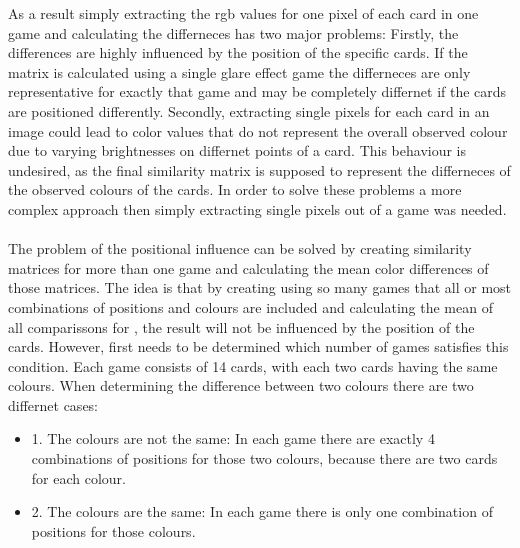 As a result simply extracting the rgb values for one pixel of each card in one game and calculating the differneces has two major problems: Firstly, the differences are highly influenced by the position of the specific cards. If the matrix is calculated using a single glare effect game the differneces are only representative for exactly that game and may be completely differnet if the cards are positioned differently. Secondly, extracting single pixels for each card in an image could lead to color values that do not represent the overall observed colour due to varying brightnesses on differnet points of a card. This behaviour is undesired, as the final similarity matrix is supposed to represent the differneces of the observed colours of the cards.  In order to solve these problems a more complex approach then simply extracting single pixels out of a game was needed. \\\\
The problem of the positional influence can be solved by creating similarity matrices for more than one game and calculating the mean color differences of those matrices. The idea is that by creating using so many games that all or most combinations of positions and colours are included and calculating the mean of all comparissons for , the result will not be influenced by the position of the cards.  However, first needs to be determined which number of games satisfies this condition. Each game consists of 14 cards, with each two cards having the same colours. When determining the difference between two colours there are two differnet cases: 
\begin{itemize}
	\item 1. The colours are not the same: In each game there are exactly 4 combinations of positions for those two colours, because there are two cards for each colour. 
	\item 2. The colours are the same: In each game there is only one combination of positions for those colours.  
\end{itemize}

